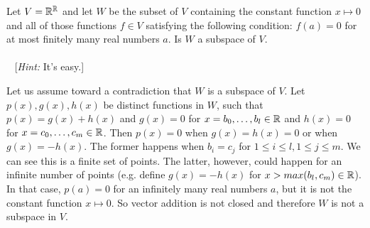\begin{problem}[Golan 76]

Let $V = \mathbb{R}^{\mathbb{R}}$ and let $W$ be the subset of $V$ containing the constant
function $x\mapsto 0$ and all of those functions $f \in V$ satisfying the
following condition: $f(a) = 0$ for at most finitely many real numbers $a$.  Is
$W$ a subspace of $V$.\\
\\~
[{\it Hint:} It's easy.]
\end{problem}
\smallskip
\begin{solution}
Let us assume toward a contradiction that $W$ is a subspace of $V$. Let $p(x), g(x), h(x)$ be distinct functions in $W$, such that $p(x) = g(x) + h(x)$ and $g(x) = 0$ for $x = b_0,\dots ,b_l \in \mathbb{R}$ and $h(x) = 0$ for $x = c_0, \dots , c_m \in \mathbb{R}$.  Then $p(x) = 0$ when $g(x) = h(x) = 0$ or when $g(x) = -h(x)$.  The former happens when $b_i = c_j$ for $1 \leq i \leq l, 1 \leq j \leq m$.  We can see this is a finite set of points.  The latter, however, could happen for an infinite number of points (e.g. define $g(x) = -h(x)$ for $x > max(b_l,c_m) \in \mathbb{R}$). In that case, $p(a) = 0$ for an infinitely many real numbers $a$, but it is not the constant function $x \mapsto 0$. So vector addition is not closed and therefore $W$ is not a subspace in $V$.
\end{solution}
\probskip



